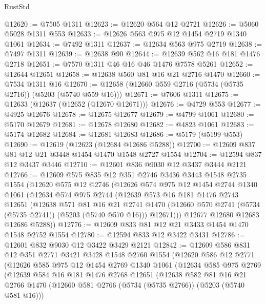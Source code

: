 \begin{lexlean}{RustStd}
\begin{coremodule}
@12620 := @7505 @1311
@12623 := @12620 @564 @12 @2721
@12626 := @5060 @5028 @1311 @553
@12633 := @12626 @563 @975 @12 @1454 @2719 @1340 @1061
@12634 := @7492 @1311
@12637 := @12634 @563 @975 @2719
@12638 := @7497 @1311
@12639 := @12638 @90
@12644 := @12639 @562 @16 @181 @1476 @2718
@12651 := @7570 @1311 @46 @16 @46 @1476 @7578 @5261
@12652 := @12644 @12651
@12658 := @12638 @560 @81 @16 @21 @2716 @1470
@12660 := @7534 @1311 @16
@12670 := @12658 (@12660 @559 @2716 (@5734 (@5735 @2716)) (@5203 (@5740 @559 @16)))
@12671 := @7606 @1311
@12675 := @12633 (@12637 (@12652 (@12670 @12671)))
@12676 := @4729 @553
@12677 := @4925 @12676
@12678 := @12675 @12677
@12679 := @4799 @1061
@12680 := @5170 @12679
@12681 := @12678 @12680
@12682 := @4823 @1061
@12683 := @5174 @12682
@12684 := @12681 @12683
@12686 := @5179 (@5199 @553)
@12690 := @12619 (@12623 (@12684 @12686 @5288))
@12700 := @12609 @837 @81 @12 @21 @3448 @1454 @1470 @1548 @2727 @1554
@12704 := @12594 @837 @12 @3437 @3446
@12710 := @12601 @836 @9030 @12 @3437 @3444 @2121
@12766 := @12609
    @575
    @835
    @12
    @351
    @2746
    @3436
    @3443
    @1548
    @2735
    @1554
    (@12620
      @575
      @12
      @2746
      (@12626
        @574
        @975
        @12
        @1454
        @2744
        @1340
        @1061
        (@12634
          @574
          @975
          @2744
          (@12639
            @573
            @16
            @181
            @1476
            @2743
            @12651
            (@12638
              @571
              @81
              @16
              @21
              @2741
              @1470
              (@12660 @570 @2741 (@5734 (@5735 @2741)) (@5203 (@5740 @570 @16)))
              @12671)))
        @12677
        @12680
        @12683
        @12686
        @5288))
@12776 := @12609 @833 @81 @12 @21 @3433 @1454 @1470 @1548 @2752 @1554
@12780 := @12594 @833 @12 @3422 @3431
@12786 := @12601 @832 @9030 @12 @3422 @3429 @2121
@12842 := @12609
    @586
    @831
    @12
    @351
    @2771
    @3421
    @3428
    @1548
    @2760
    @1554
    (@12620
      @586
      @12
      @2771
      (@12626
        @585
        @975
        @12
        @1454
        @2769
        @1340
        @1061
        (@12634
          @585
          @975
          @2769
          (@12639
            @584
            @16
            @181
            @1476
            @2768
            @12651
            (@12638
              @582
              @81
              @16
              @21
              @2766
              @1470
              (@12660 @581 @2766 (@5734 (@5735 @2766)) (@5203 (@5740 @581 @16)))

\end{coremodule}
\end{lexlean}
